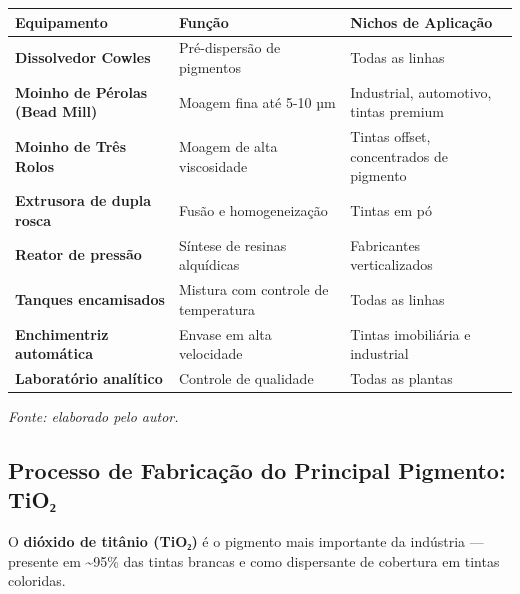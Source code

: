 \documentclass[
  12pt,
  a4paper,
  oneside,
  brazil,
  chapter=TITLE
]{article}
\newcommand{\quadrofonte}[1]{\par\noindent\textit{Fonte: #1}\vspace{1em}\par}
\begin{document}
{\def\LTcaptype{none} %
\begin{longtable}[]{@{}
  >{\raggedright\arraybackslash}p{}
  >{\raggedright\arraybackslash}p{}
  >{\raggedright\arraybackslash}p{}@{}}
\toprule\noalign{}
\begin{minipage}[b]{\linewidth}\raggedright
Equipamento
\end{minipage} & \begin{minipage}[b]{\linewidth}\raggedright
Função
\end{minipage} & \begin{minipage}[b]{\linewidth}\raggedright
Nichos de Aplicação
\end{minipage} \\
\midrule\noalign{}
\endhead
\bottomrule\noalign{}
\endlastfoot
\textbf{Dissolvedor Cowles} & Pré-dispersão de pigmentos & Todas as
linhas \\
\textbf{Moinho de Pérolas (Bead Mill)} & Moagem fina até 5-10 µm &
Industrial, automotivo, tintas premium \\
\textbf{Moinho de Três Rolos} & Moagem de alta viscosidade & Tintas
offset, concentrados de pigmento \\
\textbf{Extrusora de dupla rosca} & Fusão e homogeneização & Tintas em
pó \\
\textbf{Reator de pressão} & Síntese de resinas alquídicas & Fabricantes
verticalizados \\
\textbf{Tanques encamisados} & Mistura com controle de temperatura &
Todas as linhas \\
\textbf{Enchimentriz automática} & Envase em alta velocidade & Tintas
imobiliária e industrial \\
\textbf{Laboratório analítico} & Controle de qualidade & Todas as
plantas \\
\end{longtable}
}

\quadrofonte{elaborado pelo autor.}

\subsection{Processo de Fabricação do Principal Pigmento:
TiO₂}\label{processo-de-fabricauxe7uxe3o-do-principal-pigmento-tioux2082}

O \textbf{dióxido de titânio (TiO₂)} é o pigmento mais importante da
indústria --- presente em \textasciitilde95\% das tintas brancas e como
dispersante de cobertura em tintas coloridas.
\end{document}
